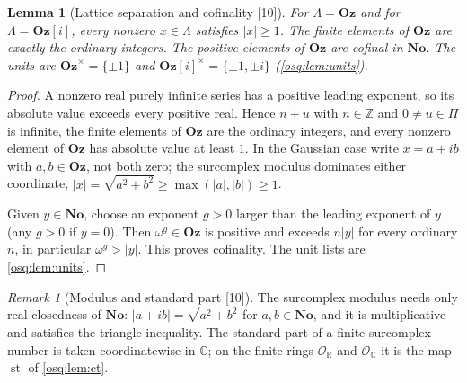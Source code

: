 \documentclass[11pt,letterpaper]{article}
\numberwithin{equation}{section}
\newtheorem{lemma}[lemma]{Lemma}
\theoremstyle{definition}
\theoremstyle{remark}
\newtheorem{remark}[remark]{Remark}
\theoremstyle{plain}
\newcommand{\No}{\mathbf{No}}
\newcommand{\Oz}{\mathbf{Oz}}
\newcommand{\GOz}{\Oz[i]}
\newcommand{\Z}{\mathbb Z}
\newcommand{\R}{\mathbb R}
\newcommand{\C}{\mathbb C}
\newcommand{\OO}{\mathcal O}         %
\newcommand{\st}{\operatorname{st}}
\newcommand{\src}[1]{\textup{\textsf{[#1]}}}
\begin{document}
\begin{lemma}[Lattice separation and cofinality \src{10}]\label{osq:pm:lem:lattice}
For $\Lambda=\Oz$ and for $\Lambda=\GOz$, every nonzero $x\in\Lambda$ satisfies
$|x|\ge1$. The finite elements of $\Oz$ are exactly the ordinary integers. The positive
elements of $\Oz$ are cofinal in $\No$. The units are $\Oz^\times=\{\pm1\}$ and
$\GOz^\times=\{\pm1,\pm i\}$ \textup{(}\cref{osq:lem:units}\textup{)}.
\end{lemma}
\begin{proof}
A nonzero real purely infinite series has a positive leading exponent, so its absolute
value exceeds every positive real. Hence $n+u$ with $n\in\Z$ and $0\ne u\in\Pi$ is
infinite, the finite elements of $\Oz$ are the ordinary integers, and every nonzero
element of $\Oz$ has absolute value at least $1$. In the Gaussian case write
$x=a+ib$ with $a,b\in\Oz$, not both zero; the surcomplex modulus dominates either
coordinate, $|x|=\sqrt{a^2+b^2}\ge\max(|a|,|b|)\ge1$.

Given $y\in\No$, choose an exponent $g>0$ larger than the leading exponent of $y$ (any
$g>0$ if $y=0$). Then $\omega^g\in\Oz$ is positive and exceeds $n|y|$ for every ordinary
$n$, in particular $\omega^g>|y|$. This proves cofinality. The unit lists are
\cref{osq:lem:units}.
\end{proof}

\begin{remark}[Modulus and standard part \src{10}]\label{osq:pm:rem:modulus}
The surcomplex modulus needs only real closedness of $\No$: $|a+ib|=\sqrt{a^2+b^2}$ for
$a,b\in\No$, and it is multiplicative and satisfies the triangle inequality. The
standard part of a finite surcomplex number is taken coordinatewise in $\C$; on the
finite rings $\OO_\R$ and $\OO_\C$ it is the map $\st$ of \cref{osq:lem:ct}.
\end{remark}
\end{document}

